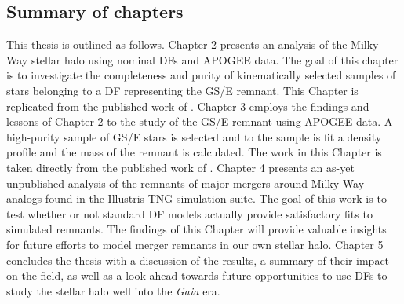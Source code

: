\subsection{Summary of chapters}

This thesis is outlined as follows. Chapter 2 presents an analysis of the Milky Way stellar halo using nominal DFs and APOGEE data. The goal of this chapter is to investigate the completeness and purity of kinematically selected samples of stars belonging to a DF representing the GS/E remnant. This Chapter is replicated from the published work of \textcite{lane22}. Chapter 3 employs the findings and lessons of Chapter 2 to the study of the GS/E remnant using APOGEE data. A high-purity sample of GS/E stars is selected and to the sample is fit a density profile and the mass of the remnant is calculated. The work in this Chapter is taken directly from the published work of \textcite{lane23}. Chapter 4 presents an as-yet unpublished analysis of the remnants of major mergers around Milky Way analogs found in the Illustris-TNG simulation suite. The goal of this work is to test whether or not standard DF models actually provide satisfactory fits to simulated remnants. The findings of this Chapter will provide valuable insights for future efforts to model merger remnants in our own stellar halo. Chapter 5 concludes the thesis with a discussion of the results, a summary of their impact on the field, as well as a look ahead towards future opportunities to use DFs to study the stellar halo well into the \textit{Gaia} era.

